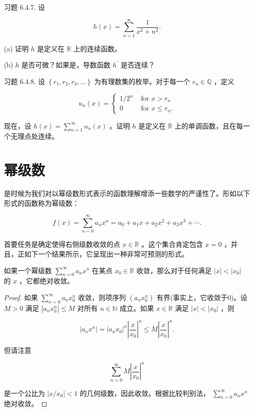 习题 6.4.7. 设

\[
h\left( x\right)  = \mathop{\sum }\limits_{{n = 1}}^{\infty }\frac{1}{{x}^{2} + {n}^{2}}.
\]

(a) 证明 \(h\) 是定义在 \(\mathbb{R}\) 上的连续函数。

(b) \(h\) 是否可微？如果是，导数函数 \({h}^{\prime }\) 是否连续？

习题 6.4.8. 设 \(\left\{  {{r}_{1},{r}_{2},{r}_{3},\ldots }\right\}\) 为有理数集的枚举。对于每一个 \({r}_{n} \in  \mathbb{Q}\) ，定义

\[
{u}_{n}\left( x\right)  = \left\{  \begin{array}{ll} 1/{2}^{n} & \text{ for }x > {r}_{n} \\  0 & \text{ for }x \leq  {r}_{n}. \end{array}\right.
\]

现在，设 \(h\left( x\right)  = \mathop{\sum }\limits_{{n = 1}}^{\infty }{u}_{n}\left( x\right)\) 。证明 \(h\) 是定义在 \(\mathbb{R}\) 上的单调函数，且在每一个无理点处连续。

\section{幂级数}
\label{sec:6.5}
是时候为我们对以幂级数形式表示的函数理解增添一些数学的严谨性了。形如以下形式的函数称为幂级数：

\[
f\left( x\right)  = \mathop{\sum }\limits_{{n = 0}}^{\infty }{a}_{n}{x}^{n} = {a}_{0} + {a}_{1}x + {a}_{2}{x}^{2} + {a}_{3}{x}^{3} + \cdots .
\]

首要任务是确定使得右侧级数收敛的点 \(x \in  \mathbb{R}\) 。这个集合肯定包含 \(x = 0\) ，并且，正如下一个结果所示，它呈现出一种非常可预测的形式。

\begin{Thm}\label{thm:6.5.1}
  如果一个幂级数 \(\mathop{\sum }\limits_{{n = 0}}^{\infty }{a}_{n}{x}^{n}\) 在某点 \({x}_{0} \in  \mathbb{R}\) 收敛，那么对于任何满足 \(\left| x\right|  < \left| {x}_{0}\right|\) 的 \(x\) ，它都绝对收敛。
\end{Thm}

\begin{proof}
  如果 \(\mathop{\sum }\limits_{{n = 0}}^{\infty }{a}_{n}{x}_{0}^{n}\) 收敛，则项序列 \(\left( {{a}_{n}{x}_{0}^{n}}\right)\) 有界(事实上，它收敛于$0$)。设 \(M > 0\) 满足 \(\left| {{a}_{n}{x}_{0}^{n}}\right|  \leq  M\) 对所有 \(n \in  \mathbb{N}\) 成立。如果 \(x \in  \mathbb{R}\) 满足 \(\left| x\right|  < \left| {x}_{0}\right|\) ，则

\[
\left| {{a}_{n}{x}^{n}}\right|  = {\left| {a}_{n}{x}_{0}\right| }^{n}{\left| \frac{x}{{x}_{0}}\right| }^{n} \leq  M{\left| \frac{x}{{x}_{0}}\right| }^{n}.
\]

但请注意

\[
\mathop{\sum }\limits_{{n = 0}}^{\infty }M{\left| \frac{x}{{x}_{0}}\right| }^{n}
\]

是一个公比为 \(\left| {x/{x}_{0}}\right|  < 1\) 的几何级数，因此收敛。根据比较判别法， \(\mathop{\sum }\limits_{{n = 0}}^{\infty }{a}_{n}{x}^{n}\) 绝对收敛。
\end{proof}

